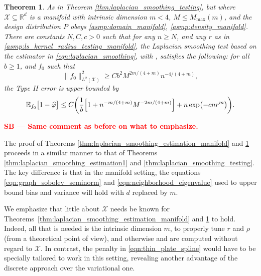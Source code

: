 \documentclass[twoside]{article}
\newcommand{\red}[1]{\textcolor{red}{#1}}
\newcommand{\sbcomment}[1]{{\bf{{\red{{SB --- #1}}}}}}
\newcommand{\Reals}{\mathbb{R}}
\newcommand{\1}{\mathbf{1}}
\newcommand{\Rd}{\Reals^d}
\newcommand{\Xset}{\mathcal{X}}
\newcommand{\Leb}{L}
\newcommand{\Ebb}{\mathbb{E}}
\newcommand{\wh}[1]{\widehat{#1}}
\newtheorem{theorem}{Theorem}
\theoremstyle{definition}
\theoremstyle{remark}
\begin{document}
\begin{theorem}
	\label{thm:laplacian_smoothing_testing_manifold}
	As in Theorem \ref{thm:laplacian_smoothing_testing}, but where $\Xset \subseteq \Rd$ is a manifold with intrinsic dimension $m < 4$, $M \leq M_{\max}(m)$, and the design distribution $P$ obeys \ref{asmp:domain_manifold}, \ref{asmp:density_manifold}.
	There are constants $N,C,c>0$ such that for any $n \geq N$, and any $r$ as in \ref{asmp:ls_kernel_radius_testing_manifold}, the Laplacian smoothing test \smash{$\wh{\varphi}$} based on the estimator \smash{$\wh{f}$} in \eqref{eqn:laplacian_smoothing}, with , satisfies the following: for all $b \geq 1$, and $f_0$ such that
	\begin{equation}
	\label{eqn:laplacian_smoothing_testing_manifold}
	\bigl\|f_0\bigr\|_{\Leb^2(\Xset)}^2 \geq C b^2 M^{2m/(4 + m)} n^{-4/(4 + m)},
	\end{equation} 
	the Type II error is upper bounded by
	\begin{equation*}
	\Ebb_{f_0}\bigl[1 - \wh{\varphi} \bigr] \leq C\biggl(\frac{1}{b}\Bigl[1 + n^{-m/(4 + m)}M^{-2m/(4 + m)}\Bigr] + n\exp\bigl(-cnr^m\bigr)\biggr).
	\end{equation*}
\end{theorem}
\sbcomment{Same comment as before on what to emphasize.}

The proof of Theorems \ref{thm:laplacian_smoothing_estimation_manifold} and \ref{thm:laplacian_smoothing_testing_manifold} proceeds in a similar manner to that of Theorems \ref{thm:laplacian_smoothing_estimation1} and \ref{thm:laplacian_smoothing_testing}. The key difference is that in the manifold setting, the equations \eqref{eqn:graph_sobolev_seminorm} and \eqref{eqn:neighborhood_eigenvalue} used to upper bound bias and variance will hold with $d$ replaced by $m$.

We emphasize that little about $\Xset$ needs be known for Theorems~\ref{thm:laplacian_smoothing_estimation_manifold} and \ref{thm:laplacian_smoothing_testing_manifold} to hold. Indeed, all that is needed is the intrinsic dimension $m$, to properly tune $r$ and $\rho$ (from a theoretical point of view), and otherwise \smash{$\wh{f}$} and \smash{$\wh{\varphi}$} are computed without regard to $\Xset$. In contrast, the penalty in \eqref{eqn:thin_plate_spline} would have to be specially tailored to work in this setting, revealing another advantage of the discrete approach over the variational one.
\end{document}
